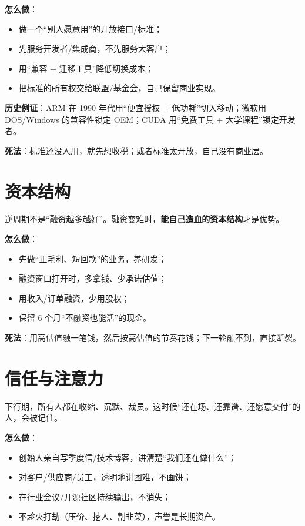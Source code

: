 \textbf{怎么做}：

\begin{itemize}
\tightlist
\item
  做一个``别人愿意用''的开放接口/标准；
\item
  先服务开发者/集成商，不先服务大客户；
\item
  用``兼容 + 迁移工具''降低切换成本；
\item
  把标准的所有权交给联盟/基金会，自己保留商业实现。
\end{itemize}

\textbf{历史例证}：ARM 在 1990 年代用``便宜授权 +
低功耗''切入移动；微软用 DOS/Windows 的兼容性锁定 OEM；CUDA 用``免费工具
+ 大学课程''锁定开发者。

\textbf{死法}：标准还没人用，就先想收税；或者标准太开放，自己没有商业层。

\section{资本结构}\label{ux8d44ux672cux7ed3ux6784}

逆周期不是``融资越多越好''。融资变难时，\textbf{能自己造血的资本结构}才是优势。

\textbf{怎么做}：

\begin{itemize}
\tightlist
\item
  先做``正毛利、短回款''的业务，养研发；
\item
  融资窗口打开时，多拿钱、少承诺估值；
\item
  用收入/订单融资，少用股权；
\item
  保留 6 个月``不融资也能活''的现金。
\end{itemize}

\textbf{死法}：用高估值融一笔钱，然后按高估值的节奏花钱；下一轮融不到，直接断裂。

\section{信任与注意力}\label{ux4fe1ux4efbux4e0eux6ce8ux610fux529b}

下行期，所有人都在收缩、沉默、裁员。这时候``还在场、还靠谱、还愿意交付''的人，会被记住。

\textbf{怎么做}：

\begin{itemize}
\tightlist
\item
  创始人亲自写季度信/技术博客，讲清楚``我们还在做什么''；
\item
  对客户/供应商/员工，透明地讲困难，不画饼；
\item
  在行业会议/开源社区持续输出，不消失；
\item
  不趁火打劫（压价、挖人、割韭菜），声誉是长期资产。
\end{itemize}

